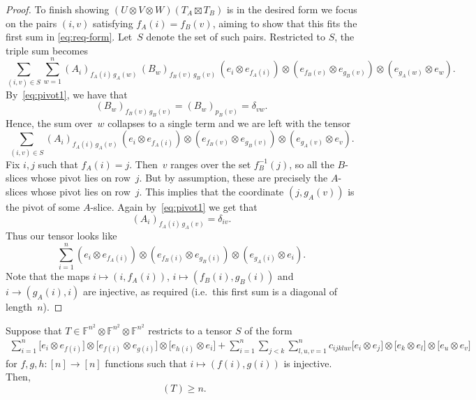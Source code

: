 \documentclass{daj}
\DeclareMathOperator{\bordersubrank}{\underline{Q}}
\newcommand{\FF}{\mathbb{F}}
\newcommand{\beqn}{\begin{equation*}}
\newcommand{\eeqn}{\end{equation*}}
\begin{document}
\begin{proof}
To finish showing $(U\otimes V\otimes W)(T_A\boxtimes T_B)$ is in the desired form we focus on the pairs $(i,v)$ satisfying $f_A(i) = f_B(v)$, aiming to show that this fits the first sum in \eqref{eq:req-form}. 
Let~$S$ denote the set of such pairs.
Restricted to $S$, the triple sum becomes
\beqn
\sum_{(i,v)\in S}\sum_{w=1}^n 
(A_i)_{f_A(i)\,g_A(w)}\, (B_w)_{f_B(v)\,g_B(v)}\, 
(e_i\otimes e_{f_A(i)})\otimes (e_{f_B(v)}\otimes e_{g_B(v)})\otimes (e_{g_A(w)}\otimes e_w).
\eeqn
By~\eqref{eq:pivot1}, we have that 
\beqn
(B_w)_{f_B(v)\,g_B(v)} = (B_w)_{p_B(v)} = \delta_{vw}.
\eeqn
Hence, the sum over~$w$ collapses to a single term and we are left with the tensor 
\beqn
\sum_{(i,v)\in S}
(A_i)_{f_A(i)\,g_A(v)}\, 
(e_i\otimes e_{f_A(i)})\otimes (e_{f_B(v)}\otimes e_{g_B(v)})\otimes (e_{g_A(v)}\otimes e_v).
\eeqn
Fix $i,j$ such that $f_A(i) = j$.
Then~$v$ ranges over the set $f_B^{-1}(j)$, so all the $B$-slices whose pivot lies on row~$j$.
But by assumption, these are precisely the $A$-slices whose pivot lies on row~$j$.
This implies that the coordinate $(j,g_A(v))$ is the pivot of some $A$-slice.
Again by~\eqref{eq:pivot1} we  get that
\beqn
(A_i)_{f_A(i)\,g_A(v)} = \delta_{iv}.
\eeqn
Thus our tensor looks like
\beqn
\sum_{i=1}^n 
(e_i\otimes e_{f_A(i)})\otimes (e_{f_B(i)}\otimes e_{g_B(i)})\otimes (e_{g_A(i)}\otimes e_i).
\eeqn
Note that the maps $i \mapsto (i, f_A(i))$, $i \mapsto (f_B(i), g_B(i))$ and $i \to (g_A(i), i)$ are injective, as required
(i.e.\ this first sum is a diagonal of length~$n$).
\end{proof}



%
%

%
%
%
%
%
%
%
%
%
%

%

%

%
%
%
%
%
%
%
%

%
%
%
%
%
%

%
%
%
%
%
%

%
%
%
%
%
%
%
%
%
%
%
%
%
%
%
%
%
%
%
%
%
%
%
%
%
%
%
%
%
%
%
%
%
%
%
%
%
%
%
%
%
%
%
%
%
%
%
%
%



%

\begin{lemma} \label{lem:border-subrank-for-upper-triag}
Suppose that $T\in\FF^{n^2}\otimes\FF^{n^2}\otimes\FF^{n^2}$ restricts to a tensor $S$ of the form
\begin{multline*}
\sum_{i=1}^n \big[e_i\otimes e_{f(i)}\big]\otimes\big[e_{f(i)}\otimes e_{g(i)}\big] \otimes \big[e_{h(i)}\otimes e_i\big]
+ \sum_{i=1}^n\sum_{j<k}\sum_{l,u,v=1}^n c_{ijkluv}\big[e_i\otimes e_j\big]\otimes \big[e_k\otimes e_l\big]\otimes \big[e_u\otimes e_v]
\end{multline*}
for $f,g,h:[n]\to[n]$ functions such that $i\mapsto(f(i),g(i))$ is injective.
Then,
    \[\bordersubrank(T) \geq n.\]
\end{lemma}
\end{document}
